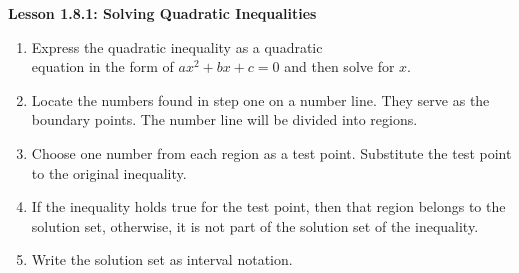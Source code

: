 \begin{center}
\textbf{Lesson 1.8.1: Solving Quadratic Inequalities}
\end{center}

\vspace*{1ex}

\begin{enumerate}[label = \color{blue}\arabic*. ]
\item Express the quadratic inequality as a quadratic \\equation in the form of 
$ ax^{2} + bx + c = 0 $ and then solve for $x$. 
\item Locate the numbers found in step one on a number line. They serve as the boundary points. The number line will be divided into regions.
\item Choose one number from each region as a test point. Substitute the test point to the original inequality. 
\item If the inequality holds true for the test point, then that region belongs to the solution set, otherwise, it is not part of the solution set of the inequality.
\item Write the solution set as interval notation.
\end{enumerate}





